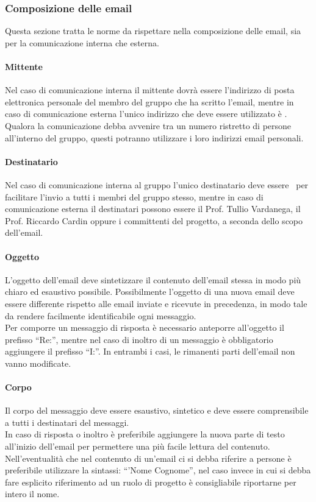 \documentclass[../NormeProgetto.tex]{subfiles}
\begin{document}
		\subsubsection{Composizione delle email}
			Questa sezione tratta le norme da rispettare nella composizione delle email, sia per la comunicazione interna che esterna.
			\paragraph{Mittente}
				Nel caso di comunicazione interna il mittente dovrà essere l'indirizzo di posta elettronica personale del membro del gruppo che ha scritto l'email, mentre in caso di comunicazione esterna l'unico indirizzo che deve essere utilizzato è \mailleaf. \\ Qualora la comunicazione debba avvenire tra un numero ristretto di persone all'interno del gruppo, questi potranno utilizzare i loro indirizzi email personali.
			\paragraph{Destinatario}
				Nel caso di comunicazione interna al gruppo l'unico destinatario deve essere \mailleaf\ per facilitare l'invio a tutti i membri del gruppo stesso, mentre in caso di comunicazione esterna il destinatari possono essere il Prof. Tullio Vardanega, il Prof. Riccardo Cardin oppure i committenti del progetto, a seconda dello scopo dell'email.
			\paragraph{Oggetto}
				L'oggetto dell'email deve sintetizzare il contenuto dell'email stessa in modo più chiaro ed esaustivo possibile. Possibilmente l'oggetto di una nuova email deve essere differente rispetto alle email inviate e ricevute in precedenza, in modo tale da rendere facilmente identificabile ogni messaggio. \\ Per comporre un messaggio di risposta è necessario anteporre all'oggetto il prefisso ``Re:'', mentre nel caso di inoltro di un messaggio è obbligatorio aggiungere il prefisso ``I:''. In entrambi i casi, le rimanenti parti dell'email non vanno modificate.
			\paragraph{Corpo}
				Il corpo del messaggio deve essere esaustivo, sintetico e deve essere comprensibile a tutti i destinatari del messaggi. \\ In caso di risposta o inoltro è preferibile aggiungere la nuova parte di testo all'inizio dell'email per permettere una più facile lettura del contenuto. \\ Nell'eventualità che nel contenuto di un'email ci si debba riferire a persone è preferibile utilizzare la sintassi: ``'Nome Cognome'', nel caso invece in cui si debba fare esplicito riferimento ad un ruolo di progetto è consigliabile riportarne per intero il nome.
\end{document}
